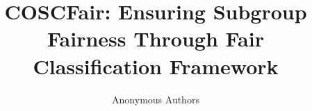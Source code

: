 \documentclass[sigconf,table]{acmart}
\begin{document}

\title{COSCFair: Ensuring Subgroup Fairness Through Fair Classification Framework}


 







\author{Anonymous Authors}
\end{document}
